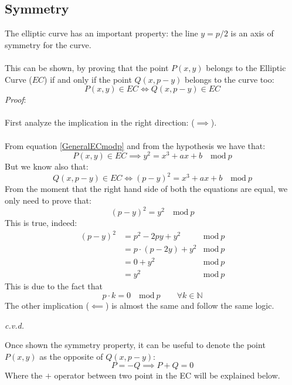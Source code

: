 \subsection{Symmetry}
The elliptic curve has an important property: the line $y=p/2$ is an axis of symmetry for the curve.
\\ \\
This can be shown, by proving that the point $P(x,y)$ belongs to the Elliptic Curve ($EC$) if and only if the point $Q(x,p-y)$ belongs to the curve too:
\begin{equation*}
P(x,y) \in EC \iff Q(x,p-y) \in EC
\end{equation*}
\textit{Proof}:
\\ \\
First analyze the implication in the right direction: ($\implies $).
\\ \\
From equation \ref{GeneralECmodp} and from the hypothesis we have that:
\begin{equation*}
P(x,y) \in EC \implies y^2=x^3+ax+b \quad \textrm{mod} \ p
\end{equation*}
But we know also that: 
\begin{equation*}
Q(x,p-y) \in EC \iff (p-y)^2=x^3+ax+b \quad \textrm{mod} \ p
\end{equation*}
From the moment that the right hand side of both the equations are equal, we only need to prove that:
\begin{equation*}
(p-y)^2=y^2 \quad \textrm{mod} \ p
\end{equation*}
This is true, indeed:
\begin{align*}
(p-y)^2 & = p^2 -2py + y^2 &  \textrm{mod} \ p \\
& = p\cdot(p -2y) + y^2 &  \textrm{mod} \ p \\
& = 0+y^2 &  \textrm{mod} \ p \\
& = y^2 &  \textrm{mod} \ p
\end{align*}
This is due to the fact that 
\begin{equation*}
p\cdot k =0 \quad \textrm{mod} \ p \qquad \forall k\in \mathbb{N}
\end{equation*}
The other implication ($\impliedby$) is almost the same and follow the same logic.
\begin{flushright}
	\textit{c.v.d.}
\end{flushright}
Once shown the symmetry property, it can be useful to denote the point $P(x,y)$ as the opposite of $Q(x,p-y)$:
\begin{equation*}
P=-Q \implies P+Q=0
\end{equation*}
Where the $+$ operator between two point in the EC will be explained below.


